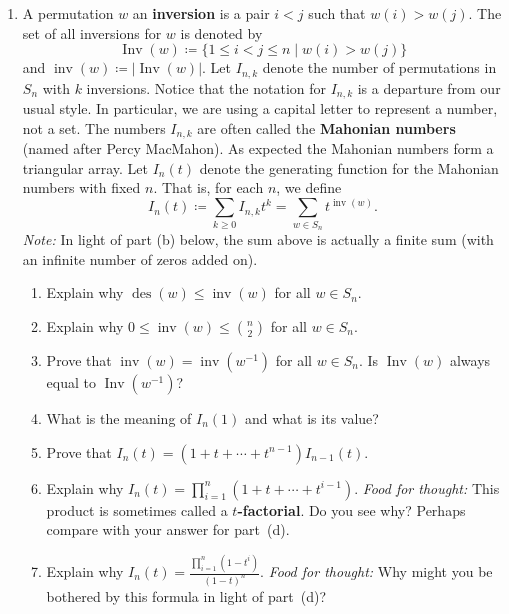 \documentclass[11pt]{article}%
\theoremstyle{definition}
\DeclareMathOperator{\des}{des}
\DeclareMathOperator{\Inv}{Inv}
\DeclareMathOperator{\inv}{inv}
\begin{document}
\begin{enumerate}
\item A permutation $w$ an \textbf{inversion} is a pair $i<j$ such that $w(i)>w(j)$.  The set of all inversions for $w$ is denoted by
\[
\Inv(w)\coloneqq \{1\leq i<j\leq n\mid w(i)>w(j)\}
\] 
and $\inv(w)\coloneqq |\Inv(w)|$. Let $I_{n,k}$ denote the number of permutations in $S_n$ with $k$ inversions.  Notice that the notation for $I_{n,k}$ is a departure from our usual style.  In particular, we are using a capital letter to represent a number, not a set. The numbers $I_{n,k}$ are often called the \textbf{Mahonian numbers} (named after Percy MacMahon). As expected the Mahonian numbers form a triangular array. Let $I_n(t)$ denote the generating function for the Mahonian numbers with fixed $n$. That is, for each $n$, we define
\[
I_n(t)\coloneqq \sum_{k\geq 0}I_{n,k}t^k=\sum_{w\in S_n} t^{\inv(w)}.
\]
\emph{Note:} In light of part (b) below, the sum above is actually a finite sum (with an infinite number of zeros added on).
\begin{enumerate}
\item Explain why $\des(w)\leq \inv(w)$ for all $w\in S_n$.
\item Explain why $0\leq \inv(w)\leq \binom{n}{2}$ for all $w\in S_n$.
\item Prove that $\inv(w)=\inv(w^{-1})$ for all $w\in S_n$. Is $\Inv(w)$ always equal to $\Inv(w^{-1})$?
\item What is the meaning of $I_n(1)$ and what is its value?
\item Prove that $I_n(t)=(1+t+\cdots +t^{n-1})I_{n-1}(t)$.
\item Explain why $I_n(t)=\prod_{i=1}^n (1+t+\cdots +t^{i-1})$. \emph{Food for thought:} This product is sometimes called a \textbf{$t$-factorial}. Do you see why? Perhaps compare with your answer for part~(d).
\item Explain why $\displaystyle I_n(t)=\frac{\prod_{i=1}^n(1-t^i)}{(1-t)^n}$. \emph{Food for thought:} Why might you be bothered by this formula in light of part~(d)?
\end{enumerate}

\end{enumerate}
\end{document}
